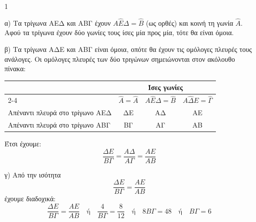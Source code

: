 \begin{ylh}{1}
    \item [ΛΥΣΗ]
\end{ylh}
\begin{figure}
\centering
{}
\end{figure}
α) Τα τρίγωνα ΑΕΔ και ΑΒΓ έχουν $Α\hat{E}Δ = \hat{B}$ (ως ορθές) και κοινή τη γωνία $\hat{A}$. Αφού τα τρίγωνα έχουν δύο γωνίες τους ίσες μία προς μία, τότε θα είναι όμοια.

β) Τα τρίγωνα ΑΔΕ και ΑΒΓ είναι όμοια, οπότε θα έχουν τις ομόλογες πλευρές τους ανάλογες. Οι ομόλογες πλευρές των δύο τριγώνων σημειώνονται στον ακόλουθο πίνακα:
\begin{center}
\begin{tabular}{|l|c|c|c|}
\hline
& \multicolumn{3}{c|}{Ίσες γωνίες} \\
\cline{2-4}
& $\hat{A} = \hat{A}$ & $Α\hat{Ε}Δ = \hat{Β}$ & $Α\hat{Δ}Ε = \hat{\Gamma}$ \\
\hline
Απέναντι πλευρά στο τρίγωνο ΑΕΔ & ΔΕ & ΑΔ & ΑΕ \\
\hline
Απέναντι πλευρά στο τρίγωνο ΑΒΓ & ΒΓ & ΑΓ & ΑΒ \\
\hline
\end{tabular}
\end{center}
Έτσι έχουμε:
\[ \frac{ΔΕ}{ΒΓ} = \frac{ΑΔ}{ΑΓ} = \frac{ΑΕ}{ΑΒ} \]

γ) Από την ισότητα
\[ \frac{ΔΕ}{ΒΓ} = \frac{ΑΕ}{ΑΒ} \]
έχουμε διαδοχικά:
\[ \frac{ΔΕ}{ΒΓ} = \frac{ΑΕ}{ΑΒ} \quad \text{ή} \quad \frac{4}{ΒΓ} = \frac{8}{12} \quad \text{ή} \quad 8ΒΓ = 48 \quad \text{ή} \quad ΒΓ = 6 \]